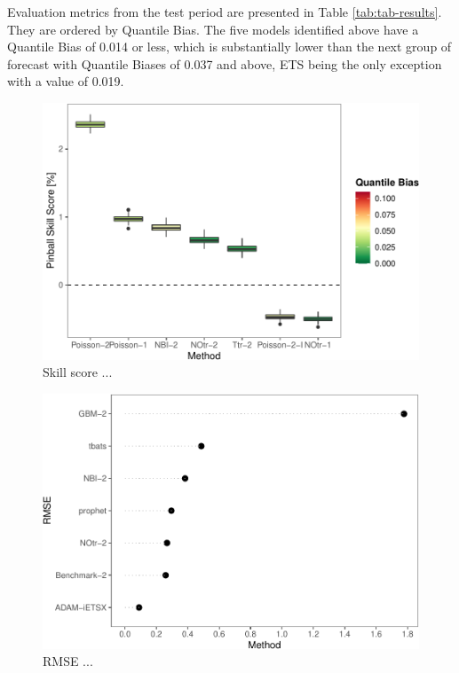 \documentclass[]{elsarticle} %
\begin{document}
Evaluation metrics from the test period are presented in Table \ref{tab:tab-results}. They are ordered by Quantile Bias. The five models identified above have a Quantile Bias of 0.014 or less, which is substantially lower than the next group of forecast with Quantile Biases of 0.037 and above, ETS being the only exception with a value of 0.019.

\begin{figure}[H]

{\centering \includegraphics[width=0.7\linewidth]{paper_files/figure-latex/Skill-rel2bench-reduced-1} 

}

\caption{Skill score ...}\label{fig:Skill-rel2bench-reduced}
\end{figure}

\begin{figure}[H]

{\centering \includegraphics[width=0.7\linewidth]{paper_files/figure-latex/rmse-1} 

}

\caption{RMSE ...}\label{fig:rmse}
\end{figure}
\end{document}
